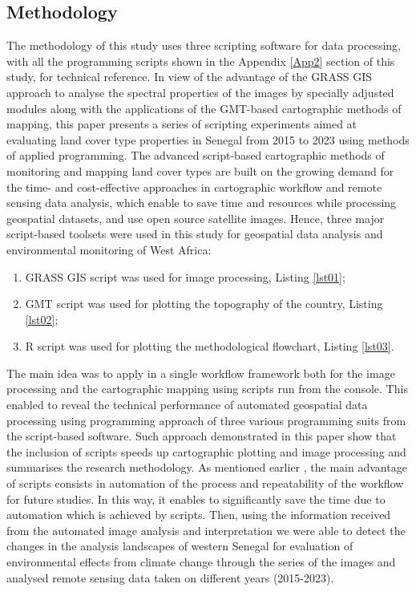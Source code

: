 \documentclass[land,article,submit,pdftex,moreauthors]{Definitions/mdpi}
\begin{document}
\subsection{Methodology}

The methodology of this study uses three scripting software for data processing, with all the programming scripts shown in the Appendix \ref{App2} section of this study, for technical reference. In view of the advantage of the GRASS GIS approach to analyse the spectral properties of the images by specially adjusted modules along with the applications of the GMT-based cartographic methods of mapping, this paper presents a series of scripting experiments aimed at evaluating land cover type properties in Senegal from 2015 to 2023 using methods of applied programming. The advanced script-based cartographic methods of monitoring and mapping land cover types are built on the growing demand for the time- and cost-effective approaches in cartographic workflow and remote sensing data analysis, which enable to save time and resources while processing geospatial datasets, and use open source satellite images. Hence, three major script-based toolsets were used in this study for geospatial data analysis and environmental monitoring of West Africa:

 \begin{enumerate}
        \item GRASS GIS script was used for image processing, Listing \ref{lst01}; 
        \item GMT script was used for plotting the topography of the country, Listing \ref{lst02};  
        \item R script was used for plotting the methodological flowchart, Listing \ref{lst03}. 
  \end{enumerate}       

 The main idea was to apply in a single workflow framework both for the image processing and the cartographic mapping using scripts run from the console. This enabled to reveal the technical performance of automated geospatial data processing using programming approach of three various programming suits from the script-based software. Such approach demonstrated in this paper show that the inclusion of scripts speeds up cartographic plotting and image processing and summarises the research methodology. As mentioned earlier \cite{Lemenkova202215}, the main advantage of scripts consists in automation of the process and repeatability of the workflow for future studies. In this way, it enables to significantly save the time due to automation which is achieved by scripts. Then, using the information received from the automated image analysis and interpretation we were able to detect the changes in the analysis landscapes of western Senegal for evaluation of environmental effects from climate change through the series of the images and analysed remote sensing data taken on different years (2015-2023). 
\end{document}
